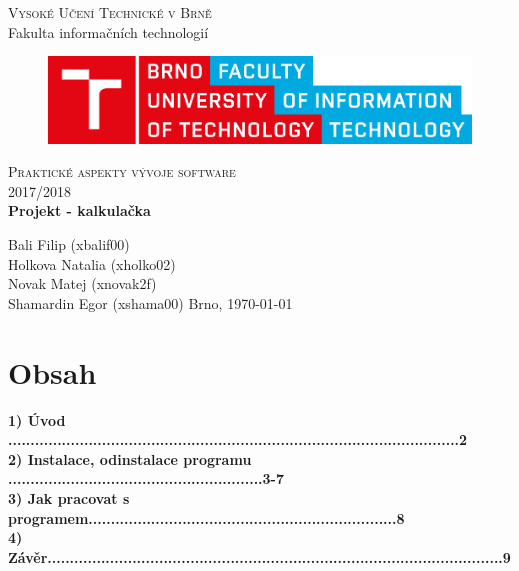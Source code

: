 \documentclass[12pt,a4paper]{article}
\begin{document}

	\begin{titlepage}
		\begin{center}
			\textsc{\LARGE Vysoké Učení Technické v Brně} \\[0.5cm]
			{\LARGE Fakulta informačních technologií}
			\vspace{2cm}
			\begin{figure}[H]
				\center\includegraphics[width=0.8\linewidth]{pictures/VUT} 
			\end{figure}

			\vspace{1cm}

			\textsc{\LARGE Praktické aspekty vývoje software} \\[0.5cm]
			\textsc{\LARGE 2017/2018} \\[3.5cm]

			\textbf{{\LARGE Projekt - kalkulačka}}
		\end{center}
		\vfill
		\begin{flushleft} 
			\large
			Bali Filip (xbalif00) \\
			Holkova Natalia (xholko02) \\
			Novak Matej (xnovak2f) \\
			Shamardin Egor (xshama00)
			\hfill
			Brno, \today
		\end{flushleft}
	\end{titlepage}


	\section*{\LARGE Obsah}
	\begin{flushleft}
		\textbf{1) Úvod .....................................................................................................2} \\
		\vspace{5mm}
		\textbf{2) Instalace, odinstalace programu .........................................................3-7} \\
		\vspace{5mm}
		\textbf{3) Jak pracovat s programem.....................................................................8} \\
		\vspace{5mm}
		\textbf{4) Závěr......................................................................................................9} \\
	\end{flushleft}
\end{document}
